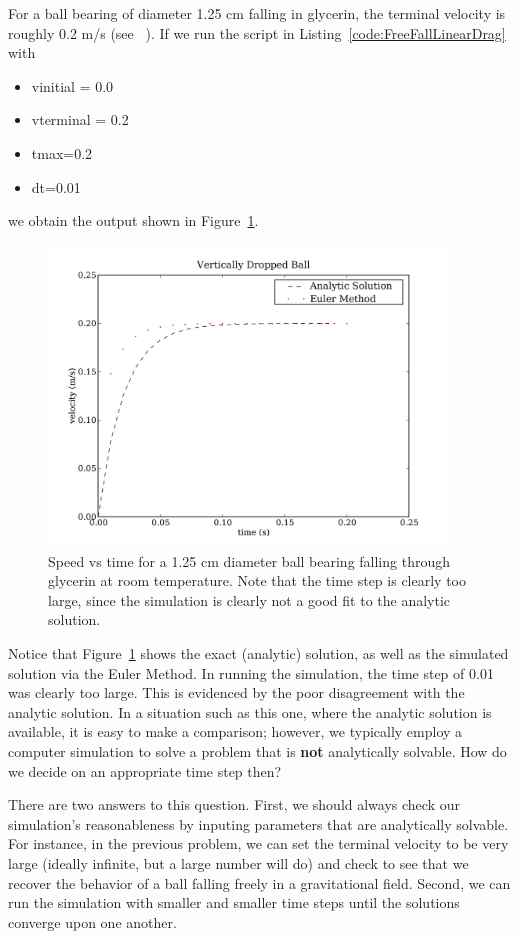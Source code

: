 For a ball bearing of diameter 1.25 cm falling in glycerin, the terminal velocity is roughly 0.2 m/s (see ~\cite{Baamann:2002}). If we run the script in Listing~\ref{code:FreeFallLinearDrag} with 
\begin{itemize}
	\item vinitial = 0.0
	\item vterminal = 0.2
	\item  tmax=0.2
	\item dt=0.01
\end{itemize}
we obtain the output shown in Figure~\ref{fig:glycerin}.
\begin{figure}
\centering
\includegraphics[height=8cm]{Figures/5Kinematics/glycerin}
\caption{Speed vs time for a 1.25 cm diameter ball bearing falling through glycerin at room temperature. Note that the time step is clearly too large,
since the simulation is clearly not a good fit to the analytic solution.}
\label{fig:glycerin}       %
\end{figure}

Notice that Figure~\ref{fig:glycerin} shows the exact (analytic) solution, as well as the simulated solution via the Euler Method. In running the simulation, the time step of 0.01 was clearly too large. This is evidenced by the poor disagreement with the analytic solution. In a situation such as this one, where the analytic solution is available, it is easy to make a comparison; however, we typically employ a computer simulation to solve a problem that is \textbf{not} analytically solvable. How do we decide on an appropriate time step then?

There are two answers to this question. First, we should always check our simulation's reasonableness by inputing parameters that are analytically solvable. For instance, in the previous problem, we can set the terminal velocity to be very large (ideally infinite, but a large number will do) and check to see that we recover the behavior of a ball falling freely in a gravitational field. Second, we can run the simulation with smaller and smaller time steps until the solutions converge upon one another. 

